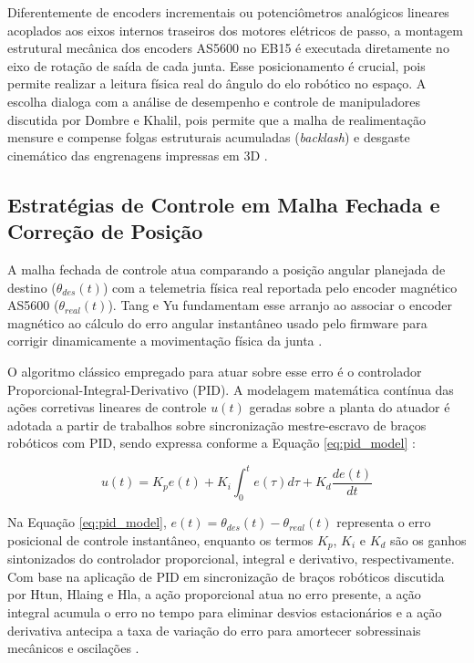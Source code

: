 Diferentemente de encoders incrementais ou potenciômetros analógicos lineares acoplados aos eixos internos traseiros dos motores elétricos de passo, a montagem estrutural mecânica dos encoders AS5600 no EB15 é executada diretamente no eixo de rotação de saída de cada junta. Esse posicionamento é crucial, pois permite realizar a leitura física real do ângulo do elo robótico no espaço. A escolha dialoga com a análise de desempenho e controle de manipuladores discutida por Dombre e Khalil, pois permite que a malha de realimentação mensure e compense folgas estruturais acumuladas (\textit{backlash}) e desgaste cinemático das engrenagens impressas em 3D \cite{dombre2007robot}.

\subsection{Estratégias de Controle em Malha Fechada e Correção de Posição}
\label{subsec:estrategias_controle}

A malha fechada de controle atua comparando a posição angular planejada de destino ($\theta_{des}(t)$) com a telemetria física real reportada pelo encoder magnético AS5600 ($\theta_{real}(t)$). Tang e Yu fundamentam esse arranjo ao associar o encoder magnético ao cálculo do erro angular instantâneo usado pelo firmware para corrigir dinamicamente a movimentação física da junta \cite{tang2022research}.

O algoritmo clássico empregado para atuar sobre esse erro é o controlador Proporcional-Integral-Derivativo (PID). A modelagem matemática contínua das ações corretivas lineares de controle $u(t)$ geradas sobre a planta do atuador é adotada a partir de trabalhos sobre sincronização mestre-escravo de braços robóticos com PID, sendo expressa conforme a Equação \ref{eq:pid_model} \cite{htun2023master}:

\begin{equation}
\label{eq:pid_model}
u(t) = K_p e(t) + K_i \int_{0}^{t} e(\tau) d\tau + K_d \frac{de(t)}{dt}
\end{equation}

Na Equação \ref{eq:pid_model}, $e(t) = \theta_{des}(t) - \theta_{real}(t)$ representa o erro posicional de controle instantâneo, enquanto os termos $K_p$, $K_i$ e $K_d$ são os ganhos sintonizados do controlador proporcional, integral e derivativo, respectivamente. Com base na aplicação de PID em sincronização de braços robóticos discutida por Htun, Hlaing e Hla, a ação proporcional atua no erro presente, a ação integral acumula o erro no tempo para eliminar desvios estacionários e a ação derivativa antecipa a taxa de variação do erro para amortecer sobressinais mecânicos e oscilações \cite{htun2023master}.

